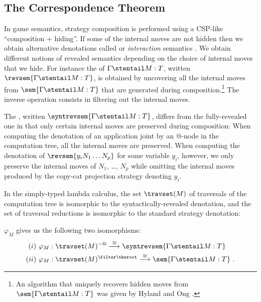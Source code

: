 \subsection{The Correspondence Theorem}

In game semantics, strategy composition is performed using a
CSP-like ``composition + hiding''. If some of the internal moves are
not hidden then we obtain alternative denotations called
 \cite{willgreenlandthesis} or
\emph{interaction} semantics \cite{DBLP:conf/sas/DimovskiGL05}.
We obtain different notions of revealed semantics depending on the
choice of internal moves that we hide. For instance the
 of $\Gamma \stentail M
:T$, written $\revsem{\Gamma \stentail M : T}$, is obtained by
uncovering all the internal moves from $\sem{\Gamma \stentail M :
T}$ that are generated during composition.\footnote{An algorithm
that uniquely recovers hidden moves from $\sem{\Gamma \stentail M :
T}$ was given by Hyland and Ong \cite[Part II]{hylandong_pcf}.} The inverse operation consists in filtering out the internal moves.

The , written
$\syntrevsem{\Gamma \stentail M : T}$, differs from the
fully-revealed one in that only certain internal moves are preserved
during composition: When computing the denotation of an application
joint by an @-node in the computation tree, all the internal moves
are preserved. When computing the denotation of $\revsem{y_i N_1
\ldots N_p}$ for some variable $y_i$, however, we only preserve the
internal moves of $N_1$, \ldots, $N_p$ while omitting the internal
moves produced by the copy-cat projection strategy denoting $y_i$.


In the simply-typed lambda calculus, the set $\travset(M)$ of
traversals of the computation tree is isomorphic to the
syntactically-revealed denotation, and the set of traversal
reductions is isomorphic to the standard strategy denotation:
\begin{theorem}
\label{thm:correspondence} $\varphi_M$ gives us the following two
isomorphisms:
\begin{eqnarray*}
(i)~\varphi_M  &: \travset(M)^{-@} \stackrel{\cong}{\longrightarrow} \syntrevsem{\Gamma \stentail M :T} \\
(ii)~\varphi_M  &: \travset(M )^{\filter \theroot} \stackrel{\cong}{\longrightarrow} \sem{\Gamma \stentail M : T} \ .
\end{eqnarray*}
\end{theorem}
\bigskip

